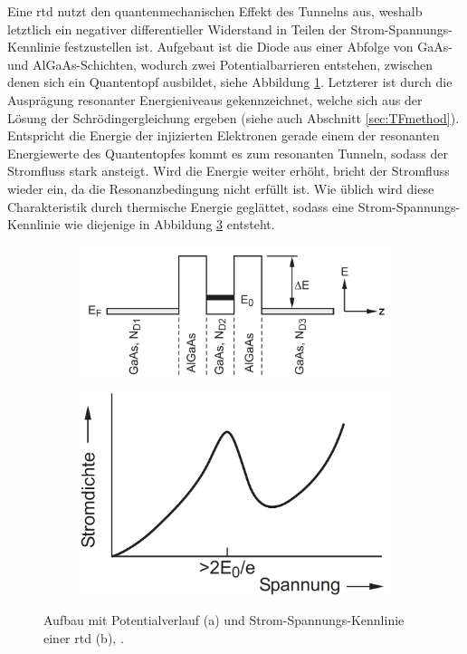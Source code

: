 Eine \ac{rtd} nutzt den quantenmechanischen Effekt des Tunnelns aus, weshalb letztlich ein negativer differentieller Widerstand in Teilen der Strom-Spannungs-Kennlinie festzustellen ist. Aufgebaut ist die Diode aus einer Abfolge von GaAs- und AlGaAs-Schichten, wodurch zwei Potentialbarrieren entstehen, zwischen denen sich ein Quantentopf ausbildet, siehe Abbildung \ref{fig:Heterostuktur}. Letzterer ist durch die Ausprägung resonanter Energieniveaus gekennzeichnet, welche sich aus der Lösung der Schrödingergleichung ergeben (siehe auch Abschnitt \ref{sec:TFmethod}). Entspricht die Energie der injizierten Elektronen gerade einem der resonanten Energiewerte des Quantentopfes kommt es zum resonanten Tunneln, sodass der Stromfluss stark ansteigt. Wird die Energie weiter erhöht, bricht der Stromfluss wieder ein, da die Resonanzbedingung nicht erfüllt ist. Wie üblich wird diese Charakteristik durch thermische Energie geglättet, sodass eine Strom-Spannungs-Kennlinie wie diejenige in Abbildung \ref{fig:IVkurve} entsteht.
\begin{figure}
    \centering
    \begin{subfigure}[b]{0.55\textwidth}
        \centering
        \includegraphics[width=\textwidth]{files/AlGaAs.png}
        \caption[]{{ }}
        \label{fig:Heterostuktur}
    \end{subfigure}
    \hfill
    \begin{subfigure}[b]{0.4\textwidth}
        \centering
        \includegraphics[width=\textwidth]{files/IVkurve.png}
        \caption[]{{ }}
        \label{fig:IVkurve}
    \end{subfigure}
    \caption[]
    {Aufbau mit Potentialverlauf (a) und Strom-Spannungs-Kennlinie einer \ac{rtd} (b), \cite{wiedenhaus}.}
\end{figure}
